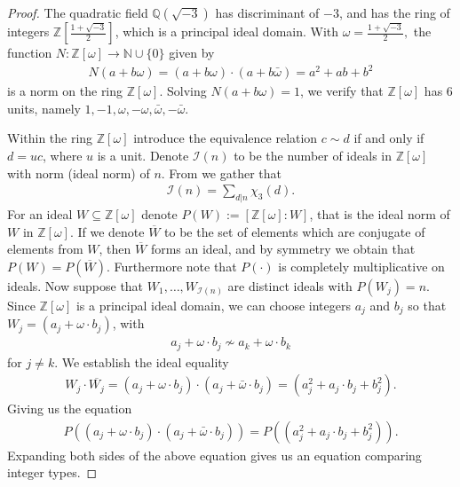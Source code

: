 \documentclass[12pt]{amsart}
\newcommand{\1}{\mathmybb{1}}
\begin{document}
\begin{proof}
The quadratic field $\mathbb{Q}(\sqrt{-3})$ has discriminant of $-3$, and has the ring of integers $\mathbb{Z}[\frac{1+\sqrt{-3}}{2}]$, which is a principal ideal domain. With $\omega = \frac{1+\sqrt{-3}}{2},$ the function $N : \mathbb{Z}[\omega] \rightarrow \mathbb{N}\cup \{0\}$ given by
\begin{align*}
N(a+b\omega) = (a+b\omega)\cdot(a+b\bar{\omega}) = a^2 +ab+b^2
\end{align*}
 is a norm on the ring $\mathbb{Z}[\omega]$. Solving $N(a+b\omega) = 1$, we verify that $\mathbb{Z}[\omega]$ has $6$ units, namely $1,-1,\omega,-\omega,\bar{\omega},-\bar{\omega}$.

Within the ring $\mathbb{Z}[\omega]$ introduce the equivalence relation $c\sim d$ if and only if $d =u c$, where $u$ is a unit. Denote $\mathcal{I}(n)$ to be the number of ideals in $\mathbb{Z}[\omega]$ with norm (ideal norm) of $n$. From \cite[pg. 301]{Muller} we gather that
 \begin{align}
 \label{Idealformulamod3}
 \mathcal{I}(n) = \sum_{d|n}\chi_{3}(d).
 \end{align}
 For an ideal $W \subseteq \mathbb{Z}[\omega]$ denote $P(W) := [\mathbb{Z}[\omega]: W]$, that is the ideal norm of $W$ in $\mathbb{Z}[\omega]$. If we denote $\overline{W}$ to be the set of elements which are conjugate of elements from $W$, then $\overline{W}$ forms an ideal, and by symmetry we obtain that $P(W) = P(\overline{W})$. Furthermore note that $P(\cdot)$ is completely multiplicative on ideals. Now suppose that $W_{1},\ldots,W_{\mathcal{I}(n)}$ are distinct ideals with $P(W_{j}) = n$.
 Since $\mathbb{Z}[\omega]$ is a principal ideal domain, we can choose integers $a_{j}$ and $b_{j}$ so that $W_{j} = (a_{j}+\omega\cdot b_{j})$, with
 \begin{align*}
 a_{j}+\omega\cdot b_{j} \not\sim a_{k}+\omega\cdot b_{k}
 \end{align*}
for $j \neq k$. We establish the ideal equality
\begin{align*}
W_{j}\cdot \overline{W_{j}} = (a_{j}+\omega\cdot b_{j})\cdot (a_{j}+\bar{\omega}\cdot b_{j}) = (a_{j}^2+a_{j}\cdot b_{j}+b_{j}^2).
\end{align*}
Giving us the equation
\begin{align*}
P((a_{j}+\omega\cdot b_{j})\cdot (a_{j}+\bar{\omega}\cdot b_{j})) = P((a_{j}^2+a_{j}\cdot b_{j}+b_{j}^2)).
\end{align*}
Expanding both sides of the above equation gives us an equation comparing integer types.

\end{proof}
\end{document}
